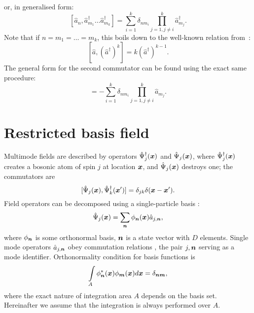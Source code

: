 or, in generalised form:
\begin{equation}
\label{eqn:multimode-formalism:single-mode-high-order-commutators}
	[ \hat{a}_n, \hat{a}_{m_1}^\dagger \ldots \hat{a}_{m_k}^\dagger ]
	= \sum\limits_{i=1}^k \delta_{n m_i}
		\prod\limits_{j=1,j \ne i}^k \hat{a}_{m_j}^\dagger.
\end{equation}
Note that if $n = m_1 = \ldots = m_k$, this boils down to the well-known relation from~\cite{Louisell1990}:
\[
	[ \hat{a}, (\hat{a}^\dagger)^k ] = k (\hat{a}^\dagger)^{k-1}.
\]
The general form for the second commutator can be found using the exact same procedure:
\begin{equation}
	[ \hat{a}_n^\dagger, \hat{a}_{m_1} \ldots \hat{a}_{m_k} ]
	= - \sum\limits_{i=1}^k \delta_{n m_i}
		\prod\limits_{j=1,j \ne i}^k \hat{a}_{m_j}.
\end{equation}


\section{Restricted basis field}

Multimode fields are described by operators $\hat{\Psi}_j^{\dagger}(\boldsymbol{x})$ and $\hat{\Psi}_j(\boldsymbol{x})$,
where $\hat{\Psi}_j^{\dagger}(\boldsymbol{x})$ creates a bosonic atom of spin $j$ at location $\boldsymbol{x}$,
and $\hat{\Psi}_j(\boldsymbol{x})$ destroys one;
the commutators are
\begin{equation}
\label{eqn:multimode-formalism:multimode-commutators}
	[ \hat{\Psi}_j(\boldsymbol{x}), \hat{\Psi}_k^{\dagger}(\boldsymbol{x}^\prime) ]
	= \delta_{jk} \delta(\boldsymbol{x}-\boldsymbol{x}^\prime).
\end{equation}
Field operators can be decomposed using a single-particle basis :
\[
	\hat{\Psi}_j(\boldsymbol{x}) = \sum\limits_{\boldsymbol{n}} \phi_{\boldsymbol{n}}(\boldsymbol{x}) \hat{a}_{j,\boldsymbol{n}},
\]
where $\phi_{\boldsymbol{n}}$ is some orthonormal basis,
$\boldsymbol{n}$ is a state vector with $D$ elements.
Single mode operators $\hat{a}_{j,\boldsymbol{n}}$ obey commutation relations ,
the pair $j,\boldsymbol{n}$ serving as a mode identifier.
Orthonormality condition for basis functions is
\[
	\int\limits_A \phi_{\boldsymbol{n}}^*(\boldsymbol{x}) \phi_{\boldsymbol{m}}(\boldsymbol{x}) d\boldsymbol{x} = \delta_{\boldsymbol{n}\boldsymbol{m}},
\]
where the exact nature of integration area $A$ depends on the basis set.
Hereinafter we assume that the integration is always performed over $A$.

